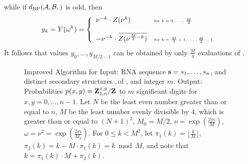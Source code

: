while if $\dBP{\strA,\strB}$ is odd, then
\begin{align}
\label{eqn:trickyRootsOfUnity2}
y_k = Y(\omega^k) = \left\{
\begin{array}{ll}
\nu^{-k} \cdot Z(\nu^k) &\mbox{\tiny for $k=0,\dots,\frac{M}{4}$}\\
\quad & \quad\\
-\nu^{-k} \cdot \overline{Z(\nu^{\frac{M}{2}-k})} &\mbox{\tiny for $k=\frac{M}{4}+1,\dots,\frac{M}{2}-1$.}\\
\end{array} \right.
\end{align}
It follows that values $y_0,\dots,y_{M/2-1}$ can be obtained by only
$\frac{M}{4}$ evaluations of \emZ{}.


\begin{figure}[!h]
\begin{small}
{\sc Improved Algorithm} for \ffttwo\hfill\break
{\sc Input:} RNA sequence ${\bf s}=s_1,\dots,s_n$, and distinct secondary
structures \strA,\,\strB of \seq, and integer $m$. \hfill\break
{\sc Output:} Probabilities $p(x,y)={\bf Z}^{x,y}_{1,n}/{\bf Z}^{}_{}$
to $m$ significant digits for $x,y=0,\dots,n-1$.
Let $N$ be the least even number greater than or equal
to $n$, $M$ be the least number evenly divisible by $4$, which is greater than
or equal to $(N+1)^2$, $M_0=M/2$, $\nu = \exp(\frac{2\pi i}{M})$,
$\omega=\nu^2= \exp(\frac{2\pi i}{M_0})$. For $0 \leq k < M^2$, let
$\pi_1(k) = \lfloor \frac{k}{M} \rfloor$,
$\pi_2(k) = k - M \cdot \pi_1(k) = k \bmod M$, and note that
$k=\pi_1(k)\cdot M + \pi_2(k)$.
\end{small}
\hfill\break
\smallskip
\begin{small}

\end{small}
\end{figure}
